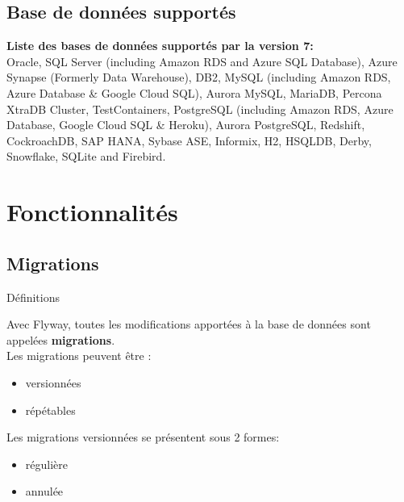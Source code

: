 \documentclass[slidestop,compress,11pt,xcolor=dvipsnames,french]{beamer}
\begin{document}
\subsection*{Base de données supportés}
\begin{frame}
\vspace{0.5cm}
\textbf {Liste des bases de données supportés par la version 7: \\}
\vspace{0.5cm} 
{\footnotesize
     Oracle, SQL Server (including Amazon RDS and Azure SQL Database), Azure Synapse (Formerly Data Warehouse), DB2, MySQL (including Amazon RDS, Azure Database \& Google Cloud SQL), Aurora MySQL, MariaDB, Percona XtraDB Cluster, TestContainers, PostgreSQL (including Amazon RDS, Azure Database, Google Cloud SQL \& Heroku), Aurora PostgreSQL, Redshift, CockroachDB, SAP HANA, Sybase ASE, Informix, H2, HSQLDB, Derby, Snowflake, SQLite and Firebird.}
\end{frame}
\section{Fonctionnalités}
\subsection*{Migrations}
\begin{frame}{Définitions}

Avec Flyway, toutes les modifications apportées à la base de données sont appelées \textbf{migrations}. \\
Les migrations peuvent être : 
\begin{itemize}
 \item versionnées
 \item répétables
\end{itemize}

Les migrations versionnées se présentent sous 2 formes:
\begin{itemize}
 \item régulière
 \item annulée
\end{itemize}

\end{frame}
\end{document}
